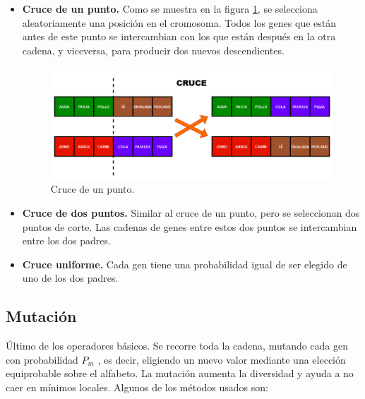\begin{itemize}
  \item \textbf{Cruce de un punto.} Como se muestra en la figura \ref{fig:cruce}, se selecciona aleatoriamente una posición en el cromosoma. Todos los genes que están antes de este punto se intercambian con los que están después en la otra cadena, y viceversa, para producir dos nuevos descendientes.
  
  \begin{figure}[H]
    \centering
    \includegraphics[width=1\textwidth]{figures/cruce.png}
    \caption{Cruce de un punto.}
    \label{fig:cruce}
  \end{figure}

  \item \textbf{Cruce de dos puntos.} Similar al cruce de un punto, pero se seleccionan dos puntos de corte. Las cadenas de genes entre estos dos puntos se intercambian entre los dos padres.
  \item \textbf{Cruce uniforme.} Cada gen tiene una probabilidad igual de ser elegido de uno de los dos padres.
\end{itemize}
\newpage
\subsection{Mutación}

Último de los operadores básicos. Se recorre toda la cadena, mutando cada gen con probabilidad \(P_m\) , es decir, eligiendo un nuevo valor mediante una elección equiprobable sobre el alfabeto. La mutación aumenta la diversidad y ayuda a no caer en mínimos locales. Algunos de los métodos usados son:

